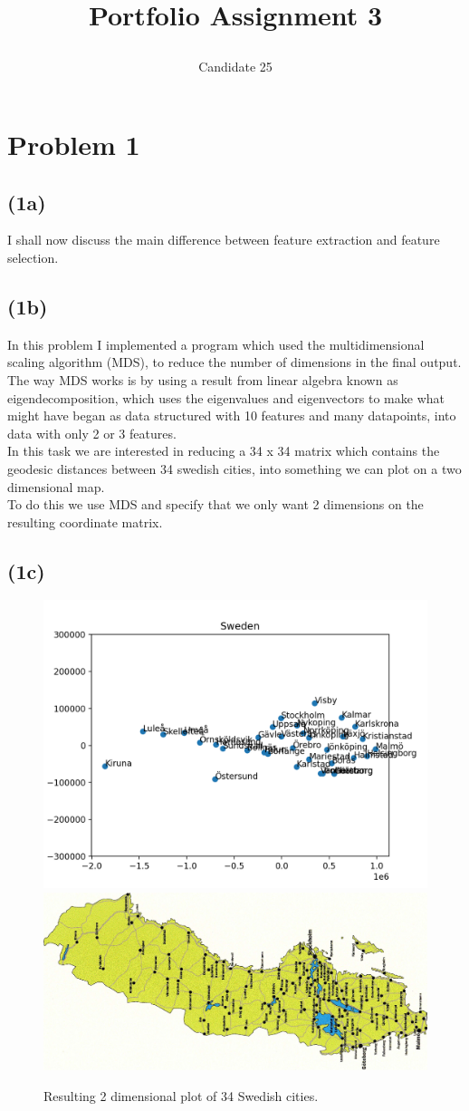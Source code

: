 \documentclass[12pt, letterpaper]{article}
\title{ \begin{huge}
\textbf{Portfolio Assignment 3}
\end{huge} }
\author{Candidate 25}
\date{}
\begin{document}
\maketitle
  \section*{Problem 1}
    \subsection*{(1a)}
      I shall now discuss the main difference between feature extraction and feature selection.
    \subsection*{(1b)}
      In this problem I implemented a program which used the multidimensional scaling algorithm (MDS), to reduce the number of dimensions in the final output. The way MDS works is by using a result from linear algebra known as eigendecomposition, which uses the eigenvalues and eigenvectors to make what might have began as data structured with 10 features and many datapoints, into data with only 2 or 3 features.\\
      In this task we are interested in reducing a 34 x 34 matrix which contains the geodesic distances between 34 swedish cities, into something we can plot on a two dimensional map.\\
      To do this we use MDS and specify that we only want 2 dimensions on the resulting coordinate matrix.
    \subsection*{(1c)}
      \begin{figure}[H]
        \caption{Resulting 2 dimensional plot of 34 Swedish cities.}
        \centering
        \includegraphics[scale=0.7]{Swedishcities}
        \includegraphics[scale=0.1]{Swedishmap}
      \end{figure}\\
\end{document}
